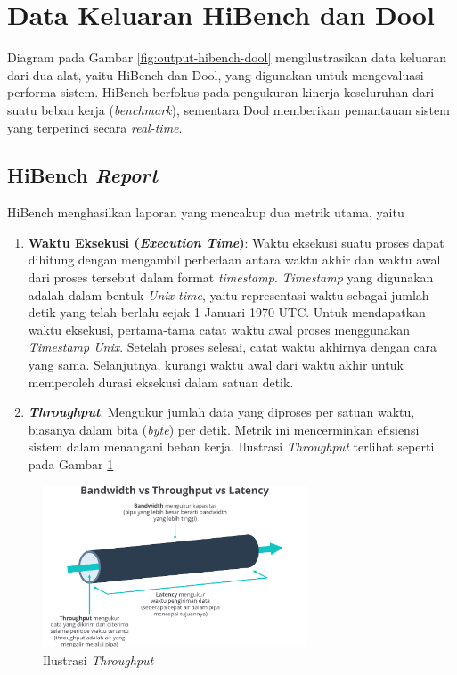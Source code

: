 \section{Data Keluaran HiBench dan Dool}
Diagram pada Gambar \ref{fig:output-hibench-dool} mengilustrasikan data keluaran dari dua alat, yaitu HiBench dan Dool, yang digunakan untuk mengevaluasi performa sistem. HiBench berfokus pada pengukuran kinerja keseluruhan dari suatu beban kerja (\textit{benchmark}), sementara Dool memberikan pemantauan sistem yang terperinci secara \textit{real-time}.

\subsection{HiBench \textit{Report}}
HiBench menghasilkan laporan yang mencakup dua metrik utama, yaitu
\begin{enumerate}
	\item \textbf{Waktu Eksekusi (\textit{Execution Time})}: Waktu eksekusi suatu proses dapat dihitung dengan mengambil perbedaan antara waktu akhir dan waktu awal dari proses tersebut dalam format \textit{timestamp}. \textit{Timestamp} yang digunakan adalah dalam bentuk \textit{Unix time}, yaitu representasi waktu sebagai jumlah detik yang telah berlalu sejak 1 Januari 1970 UTC. Untuk mendapatkan waktu eksekusi, pertama-tama catat waktu awal proses menggunakan \textit{Timestamp Unix}. Setelah proses selesai, catat waktu akhirnya dengan cara yang sama. Selanjutnya, kurangi waktu awal dari waktu akhir untuk memperoleh durasi eksekusi dalam satuan detik.
	\item \textbf{\textit{Throughput}}: Mengukur jumlah data yang diproses per satuan waktu, biasanya dalam bita (\textit{byte}) per detik. Metrik ini mencerminkan efisiensi sistem dalam menangani beban kerja. Ilustrasi \textit{Throughput} terlihat seperti pada Gambar \ref{fig:ilustrasi-throughput}
\end{enumerate}

\begin{figure}[h]
    \centering
    \includegraphics[width=0.7\textwidth]{figures/ch02/ilustrasi-lalu-lintas-jaringan.png}
    \caption{Ilustrasi \textit{Throughput} \cite{PenjelasanApaItu2023}}
    \label{fig:ilustrasi-throughput}
\end{figure}



